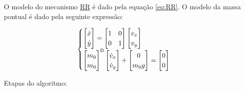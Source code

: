 \documentclass[a4paper,11pt,brazil,fleqn]{article}
\begin{document}
O modelo do mecanismo \underline{R}\underline{R} \'e dado pela equa\c{c}\~ao \eqref{eq:RR}. O modelo da massa pontual \'e dado pela seguinte express\~ao:

\begin{equation} \label{eq:MassaPontual}
\begin{cases}
\begin{bmatrix}
\dot{x} \\
\dot{y}
\end{bmatrix}
=
\begin{bmatrix}
1 & 0 \\
0 & 1
\end{bmatrix}
\begin{bmatrix}
v_{x} \\
v_{y}
\end{bmatrix}
\\
\begin{bmatrix}
m_0 \\
m_0 \\
\end{bmatrix}^{\mathsf{D}}
\begin{bmatrix}
\dot{v}_{x} \\
\dot{v}_{y}
\end{bmatrix}
+
\begin{bmatrix}
0 \\
m_0 g
\end{bmatrix}
=
\begin{bmatrix}
0 \\
0
\end{bmatrix}
\end{cases}
\end{equation}

Etapas do algoritmo:
\end{document}
